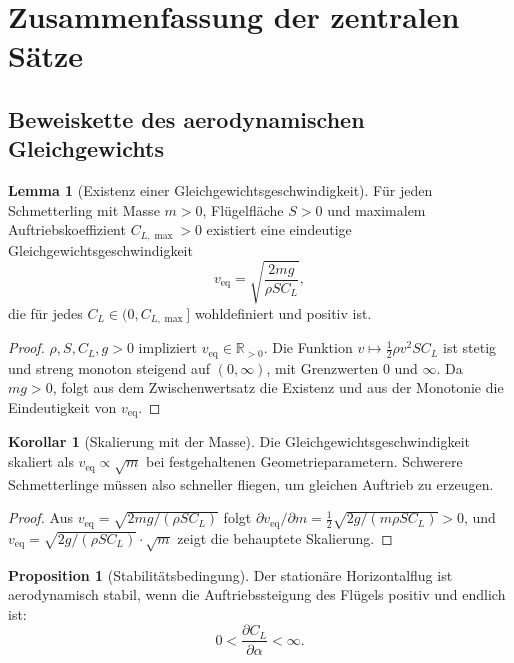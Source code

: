 ﻿\documentclass[a4paper,12pt]{article}
\theoremstyle{definition}
\newtheorem{lemma}{Lemma}
\newtheorem{korollar}{Korollar}
\newtheorem{proposition}{Proposition}
\begin{document}
	\section{Zusammenfassung der zentralen Sätze}
	
	\subsection{Beweiskette des aerodynamischen Gleichgewichts}
	
	\begin{lemma}[Existenz einer Gleichgewichtsgeschwindigkeit]
		\label{lem:gleichgewicht}
		Für jeden Schmetterling mit Masse $m > 0$, Flügelfläche $S > 0$ und
		maximalem Auftriebskoeffizient $C_{L,\max} > 0$ existiert eine eindeutige
		Gleichgewichtsgeschwindigkeit
		\[
		v_\mathrm{eq} = \sqrt{\frac{2mg}{\rho S C_L}},
		\]
		die für jedes $C_L \in (0, C_{L,\max}]$ wohldefiniert und positiv ist.
	\end{lemma}
	
	\begin{proof}
		$\rho, S, C_L, g > 0$ impliziert $v_\mathrm{eq} \in \mathbb{R}_{>0}$.
		Die Funktion $v \mapsto \frac{1}{2}\rho v^2 S C_L$ ist stetig und streng monoton
		steigend auf $(0,\infty)$, mit Grenzwerten $0$ und $\infty$.
		Da $mg > 0$, folgt aus dem Zwischenwertsatz die Existenz und aus der Monotonie
		die Eindeutigkeit von $v_\mathrm{eq}$.
	\end{proof}
	
	\begin{korollar}[Skalierung mit der Masse]
		Die Gleichgewichtsgeschwindigkeit skaliert als $v_\mathrm{eq} \propto \sqrt{m}$
		bei festgehaltenen Geometrieparametern.
		Schwerere Schmetterlinge müssen also schneller fliegen, um gleichen Auftrieb
		zu erzeugen.
	\end{korollar}
	
	\begin{proof}
		Aus $v_\mathrm{eq} = \sqrt{2mg/(\rho S C_L)}$ folgt
		$\partial v_\mathrm{eq}/\partial m = \frac{1}{2}\sqrt{2g/(m \rho S C_L)} > 0$,
		und $v_\mathrm{eq} = \sqrt{2g/(\rho S C_L)} \cdot \sqrt{m}$ zeigt die behauptete
		Skalierung.
	\end{proof}
	
	\begin{proposition}[Stabilitätsbedingung]
		Der stationäre Horizontalflug ist aerodynamisch stabil, wenn die Auftriebssteigung
		des Flügels positiv und endlich ist:
		\[
		0 < \frac{\partial C_L}{\partial \alpha} < \infty.
		\]
	\end{proposition}
	
\end{document}
